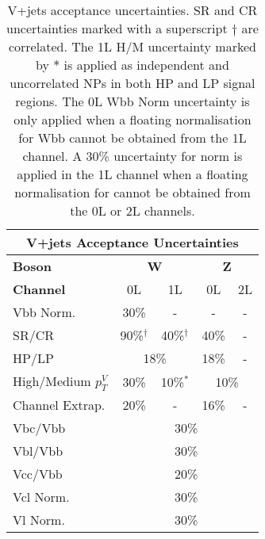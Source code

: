 \begin{table}[!htbp] 
  \footnotesize\centering
  \setlength{\tabcolsep}{0.5em} %
  \begin{tabular}{l|c|c|c|c}
      \toprule\hline
      \multicolumn{5}{c}{V+jets Acceptance Uncertainties}            
      \\ \hline
      \textbf{Boson}      & \multicolumn{2}{c|}{\textbf{W}} & \multicolumn{2}{c}{\textbf{Z}} 
      \\ \hline
      \textbf{Channel}    & 0L          & 1L         & 0L         & 2L          
      \\ \hline
      Vbb Norm.           &   30\%      &     -      &     -      &          -  
      \\ \hline
      SR/CR               &   90\%$^\dagger$         & 40\%$^\dagger$ &      40\%     & -         
      \\ \hline
      HP/LP               & \multicolumn{2}{c|}{18\%}             &   18\%      & -         
      \\ \hline
      High/Medium $p_T^V$ &   30\%      & 10\%$^*$       & \multicolumn{2}{c}{10\%}          
      \\ \hline
      Channel Extrap.             &   20\%      &   -        &    16\%    & -
      \\ \hline
      Vbc/Vbb             & \multicolumn{4}{c}{30\%}                       
      \\ \hline
      Vbl/Vbb             & \multicolumn{4}{c}{30\%}                       
      \\ \hline
      Vcc/Vbb             & \multicolumn{4}{c}{20\%}                       
      \\ \hline
      Vcl Norm.           & \multicolumn{4}{c}{30\%}                       
      \\ \hline
      Vl Norm.            & \multicolumn{4}{c}{30\%}                       
      \\ \hline\bottomrule
  \end{tabular}
  \caption{
    V+jets acceptance uncertainties.
    \Wjets SR and CR uncertainties marked with a superscript $\dagger$ are correlated.
    The 1L \Wjets H/M uncertainty marked by $*$ is applied as independent and uncorrelated NPs in both HP and LP signal regions.
    The 0L \Wjets Wbb Norm uncertainty is only applied when a floating normalisation for Wbb cannot be obtained from the 1L channel.
    A 30\% uncertainty for \Zbb norm is applied in the 1L channel when a floating normalisation for \Zbb cannot be obtained from the 0L or 2L channels.
  }
  \label{tab:Vjets acceptance uncerts}
\end{table}